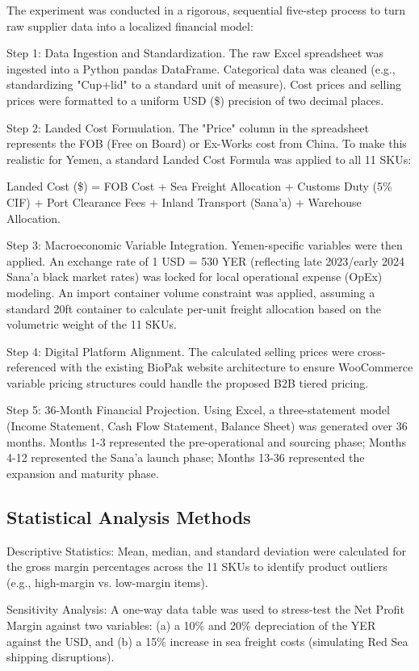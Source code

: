 \documentclass[12pt,a4paper]{article}
\begin{document}
The experiment was conducted in a rigorous, sequential five-step process to turn raw supplier data into a localized financial model:

Step 1: Data Ingestion and Standardization. The raw Excel spreadsheet was ingested into a Python pandas DataFrame. Categorical data was cleaned (e.g., standardizing "Cup+lid" to a standard unit of measure). Cost prices and selling prices were formatted to a uniform USD (\$) precision of two decimal places.

Step 2: Landed Cost Formulation. The "Price" column in the spreadsheet represents the FOB (Free on Board) or Ex-Works cost from China. To make this realistic for Yemen, a standard Landed Cost Formula was applied to all 11 SKUs:

Landed Cost (\$) = FOB Cost + Sea Freight Allocation + Customs Duty (5\% CIF) + Port Clearance Fees + Inland Transport (Sana'a) + Warehouse Allocation.

Step 3: Macroeconomic Variable Integration. Yemen-specific variables were then applied. An exchange rate of 1 USD = 530 YER (reflecting late 2023/early 2024 Sana'a black market rates) was locked for local operational expense (OpEx) modeling. An import container volume constraint was applied, assuming a standard 20ft container to calculate per-unit freight allocation based on the volumetric weight of the 11 SKUs.

Step 4: Digital Platform Alignment. The calculated selling prices were cross-referenced with the existing BioPak website architecture to ensure WooCommerce variable pricing structures could handle the proposed B2B tiered pricing.

Step 5: 36-Month Financial Projection. Using Excel, a three-statement model (Income Statement, Cash Flow Statement, Balance Sheet) was generated over 36 months. Months 1-3 represented the pre-operational and sourcing phase; Months 4-12 represented the Sana'a launch phase; Months 13-36 represented the expansion and maturity phase.

\subsection{Statistical Analysis Methods}

Descriptive Statistics: Mean, median, and standard deviation were calculated for the gross margin percentages across the 11 SKUs to identify product outliers (e.g., high-margin vs. low-margin items).

Sensitivity Analysis: A one-way data table was used to stress-test the Net Profit Margin against two variables: (a) a 10\% and 20\% depreciation of the YER against the USD, and (b) a 15\% increase in sea freight costs (simulating Red Sea shipping disruptions).
\end{document}
